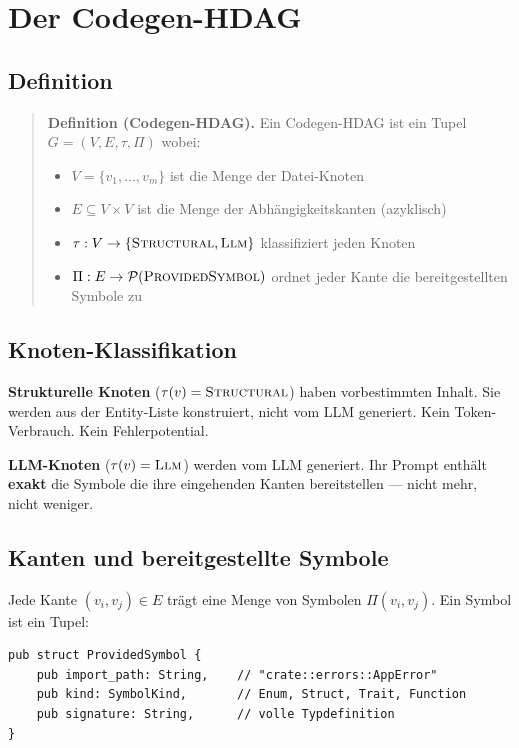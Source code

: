 \documentclass[11pt,a4paper]{article}
\begin{document}
\section{Der Codegen-HDAG}

\subsection{Definition}

\begin{quote}
\textbf{Definition (Codegen-HDAG).} Ein Codegen-HDAG ist ein Tupel
$G = (V, E, \tau, \Pi)$ wobei:
\begin{itemize}[nosep]
\item $V = \{v_1, \ldots, v_m\}$ ist die Menge der Datei-Knoten
\item $E \subseteq V \times V$ ist die Menge der Abhängigkeitskanten (azyklisch)
\item $\tau: V \to \{\textsc{Structural}, \textsc{Llm}\}$ klassifiziert jeden Knoten
\item $\Pi: E \to \mathcal{P}(\textsc{ProvidedSymbol})$ ordnet jeder Kante die
      bereitgestellten Symbole zu
\end{itemize}
\end{quote}

\subsection{Knoten-Klassifikation}

\textbf{Strukturelle Knoten} ($\tau(v) = \textsc{Structural}$) haben
vorbestimmten Inhalt. Sie werden aus der Entity-Liste konstruiert,
nicht vom LLM generiert. Kein Token-Verbrauch. Kein Fehlerpotential.

\textbf{LLM-Knoten} ($\tau(v) = \textsc{Llm}$) werden vom LLM generiert.
Ihr Prompt enthält \textbf{exakt} die Symbole die ihre eingehenden
Kanten bereitstellen --- nicht mehr, nicht weniger.

\subsection{Kanten und bereitgestellte Symbole}

Jede Kante $(v_i, v_j) \in E$ trägt eine Menge von Symbolen
$\Pi(v_i, v_j)$. Ein Symbol ist ein Tupel:

\begin{lstlisting}
pub struct ProvidedSymbol {
    pub import_path: String,    // "crate::errors::AppError"
    pub kind: SymbolKind,       // Enum, Struct, Trait, Function
    pub signature: String,      // volle Typdefinition
}
\end{lstlisting}
\end{document}
